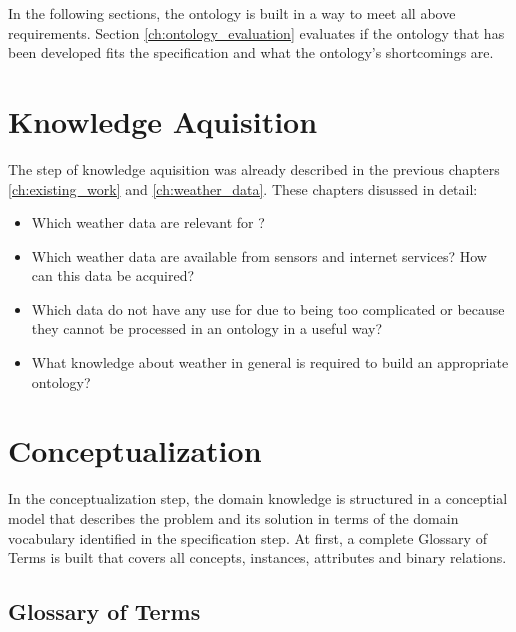 \vspace{.5cm}

In the following sections, the \thinkhomeweather ontology is built in a way to meet all above requirements. Section \ref{ch:ontology_evaluation} evaluates if the ontology that has been developed fits the specification and what the ontology's shortcomings are.

\section{Knowledge Aquisition}

The step of knowledge aquisition was already described in the previous chapters \ref{ch:existing_work} and \ref{ch:weather_data}. These chapters disussed in detail:

\begin{itemize}
  \item Which weather data are relevant for \thinkhome?
  \item Which weather data are available from sensors and internet services? How can this data be acquired?
  \item Which data do not have any use for \thinkhomeweather due to being too complicated or because they cannot be processed in an ontology in a useful way?
  \item What knowledge about weather in general is required to build an appropriate ontology? %
\end{itemize}

\section{Conceptualization}

In the conceptualization step, the domain knowledge is structured in a conceptial model that describes the problem and its solution in terms of the domain vocabulary identified in the specification step. At first, a complete Glossary of Terms is built that covers all concepts, instances, attributes and binary relations.

\subsection{Glossary of Terms}

